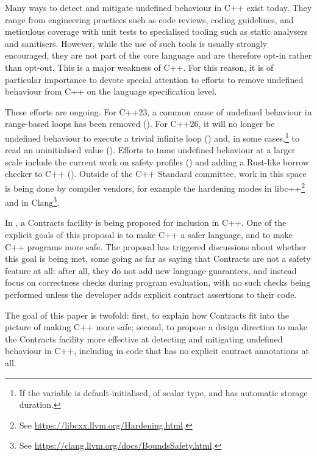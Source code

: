 Many ways to detect and mitigate undefined behaviour in C++ exist today. They range from engineering practices such as code reviews, coding guidelines, and meticulous coverage with unit tests to specialised tooling such as static analysers and sanitisers. However, while the use of such tools is usually strongly encouraged, they are not part of the core language and are therefore opt-in rather than opt-out. This is a major weakness of C++. For this reason, it is of particular importance to devote special attention to efforts to remove undefined behaviour from C++ on the language specification level.

These efforts are ongoing. For C++23, a common cause of undefined behaviour in range-based  loops has been removed (\cite{P2012R2}). For C++26, it will no longer be undefined behaviour to execute a trivial infinite loop (\cite{P2809R3}) and, in some cases,\footnote{If the  variable is default-initialised, of scalar type, and has automatic storage duration.} to read an uninitialised value (\cite{P2795R5}). Efforts to tame undefined behaviour at a larger scale include the current work on safety profiles (\cite{P3274R0}) and adding a Rust-like borrow checker to C++ (\cite{P3390R0}). Outside of the C++ Standard committee, work in this space is being done by compiler vendors, for example the hardening modes in libc++\footnote{See \href{https://libcxx.llvm.org/Hardening.html}{https://libcxx.llvm.org/Hardening.html}.} and  in Clang\footnote{See \href{https://clang.llvm.org/docs/BoundsSafety.html}{https://clang.llvm.org/docs/BoundsSafety.html}.}.

In \cite{P2900R9}, a Contracts facility is being proposed for inclusion in C++. One of the explicit goals of this proposal is to make C++ a safer language, and to make C++ programs more safe. The proposal has triggered discussions about whether this goal is being met, some going as far as saying that Contracts are not a safety feature at all: after all, they do not add new language guarantees, and instead focus on correctness checks during program evaluation, with no such checks being performed unless the developer adds explicit contract assertions to their code.

The goal of this paper is twofold: first, to explain how Contracts fit into the picture of making C++ more safe; second, to propose a design direction to make the Contracts facility more effective at detecting and mitigating undefined behaviour in C++, including in code that has no explicit contract annotations at all.

